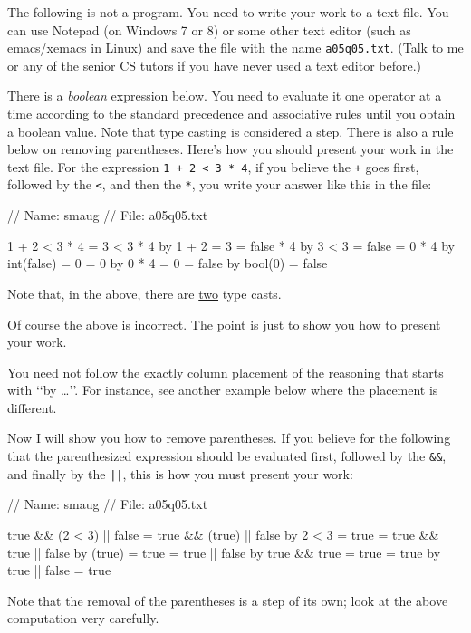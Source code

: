 The following is not a program. You need to write your work to a text file.
You can use Notepad (on Windows 7 or 8) or some other text editor
(such as emacs/xemacs in Linux) and save the file with the name
\verb!a05q05.txt!. (Talk to me or any of the senior CS tutors if you have never
used a text editor before.)

There is a \textit{boolean} expression below.
You need to evaluate it one operator at a
time according to the standard precedence and associative rules
until you obtain a boolean value.
Note that
type casting is considered a step. There is also a rule below on removing
parentheses. Here's how you should present your work in the text file. For the
expression \verb!1 + 2 < 3 * 4!, if you believe the \verb!+! goes first,
followed by the \verb!<!, and then the \verb!*!,  you write your answer like
this in the file:
\begin{console}
// Name: smaug
// File: a05q05.txt

1 + 2 < 3 * 4
= 3 < 3 * 4                                       by 1 + 2 = 3
= false * 4                                       by 3 < 3 = false
= 0 * 4                                           by int(false) = 0
= 0                                               by 0 * 4 = 0
= false                                           by bool(0) = false
\end{console}
Note that, in the above, there are \underline{two} type casts.

Of course the above is incorrect. The point is just to show you how to present
your work.

You need not follow the exactly column placement of the reasoning
that starts with \lq\lq by \dots\rq\rq. For instance, see another example
below where the placement is different.

Now I will show you how to remove parentheses. If you believe for the following
that the parenthesized expression should be evaluated first, followed by the
\verb!&&!, and finally by the \verb!||!, this is how you must present your
work:
\begin{console}
// Name: smaug
// File: a05q05.txt

true && (2 < 3) || false
= true && (true) || false                 by 2 < 3 = true
= true && true || false                   by (true) = true
= true || false                           by true && true = true
= true                                    by true || false = true
\end{console}
Note that the removal of the parentheses is a step of its own; look
at the above
computation very carefully.

